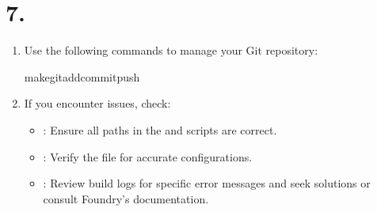 \documentclass[letterpaper,10pt,english]{sphinxmanual}
\begin{document}
\section{7. }
\label{\detokenize{quickstart:common-tasks}}\label{\detokenize{quickstart:troubleshooting}}\begin{enumerate}
%
\item {} 
\sphinxAtStartPar
{}

\sphinxAtStartPar
Use the following commands to manage your Git repository:

\begin{sphinxVerbatim}[commandchars=\\\{\}]
makegit\PYGZhy{}add\PYGZhy{}commit\PYGZhy{}push
\end{sphinxVerbatim}

\item {} 
\sphinxAtStartPar
{}

\sphinxAtStartPar
If you encounter issues, check:
\begin{itemize}
\item {} 
\sphinxAtStartPar
{}: Ensure all paths in the  and scripts are correct.

\item {} 
\sphinxAtStartPar
{}: Verify the  file for accurate configurations.

\item {} 
\sphinxAtStartPar
{}: Review build logs for specific error messages and seek solutions or consult Foundry’s documentation.

\end{itemize}

\end{enumerate}
\end{document}
